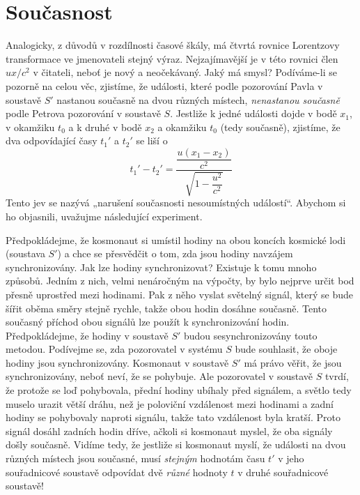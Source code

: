   \section{Současnost}\label{fyz:IchapXVsecVIII}
    Analogicky, z důvodů v rozdílnosti časové škály, má čtvrtá rovnice Lorentzovy transformace ve 
    jmenovateli stejný výraz. Nejzajímavější je v této rovnici člen \(ux/c^2\) v čitateli, neboť je 
    nový a neočekávaný. Jaký má smysl? Podíváme-li se pozorně na celou věc, zjistíme, že události, 
    které podle pozorování Pavla v soustavě \(S'\) nastanou současně na dvou různých místech, 
    \emph{nenastanou současně} podle Petrova pozorování v soustavě \(S\). Jestliže k jedné události 
    dojde v bodě \(x_1\), v okamžiku \(t_0\) a k druhé v bodě \(x_2\) a okamžiku \(t_0\) (tedy 
    současně), zjistíme, že dva odpovídající časy \(t_1'\) a \(t_2'\) se liší o
    \begin{equation*}
      t_1' - t_2'= \dfrac{\dfrac{u(x_1 - x_2)}{c^2}}{\sqrt{1 - \dfrac{u^2}{c^2}}}
    \end{equation*}
    Tento jev se nazývá „narušení současnosti nesoumístných událostí“. Abychom si ho objasnili, 
    uvažujme následující experiment.
    
    Předpokládejme, že kosmonaut si umístil hodiny na obou koncích kosmické lodi (soustava \(S'\)) 
    a chce se přesvědčit o tom, zda jsou hodiny navzájem synchronizovány. Jak lze hodiny 
    synchronizovat? Existuje k tomu mnoho způsobů. Jedním z nich, velmi nenáročným na výpočty, by 
    bylo nejprve určit bod přesně uprostřed mezi hodinami. Pak z něho vyslat světelný signál, který 
    se bude šířit oběma směry stejně rychle, takže obou hodin dosáhne současně. Tento současný 
    příchod obou signálů lze použít k synchronizování hodin. Předpokládejme, že hodiny v soustavě 
    \(S'\) budou sesynchronizovány touto metodou. Podívejme se, zda pozorovatel v systému \(S\) 
    bude souhlasit, že oboje hodiny jsou synchronizovány. Kosmonaut v soustavě \(S'\) má právo 
    věřit, že jsou synchronizovány, neboť neví, že se pohybuje. Ale pozorovatel v soustavě \(S\) 
    tvrdí, že protože se loď pohybovala, přední hodiny ubíhaly před signálem, a světlo tedy muselo 
    urazit větší dráhu, než je poloviční vzdálenost mezi hodinami a zadní hodiny se pohybovaly 
    naproti signálu, takže tato vzdálenost byla kratší. Proto signál dosáhl zadních hodin dříve, 
    ačkoli si kosmonaut myslel, že oba signály došly současně. Vidíme tedy, že jestliže si 
    kosmonaut myslí, že události na dvou různých místech jsou současné, musí \emph{stejným} 
    hodnotám času \(t'\) v jeho souřadnicové soustavě odpovídat dvě \emph{různé} hodnoty \(t\) v 
    druhé souřadnicové soustavě!
    
